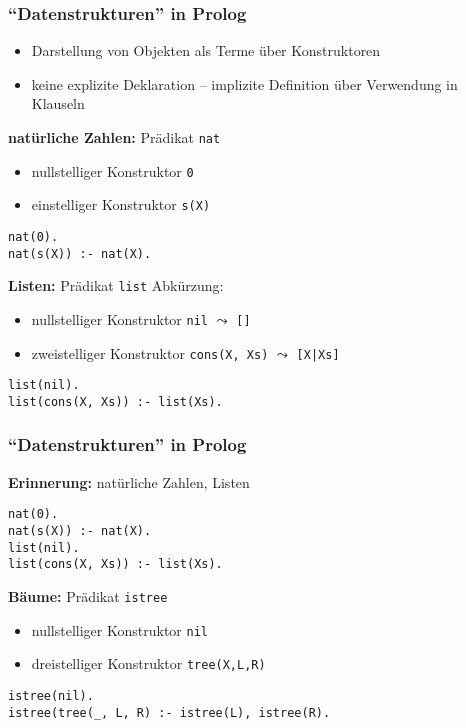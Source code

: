 \documentclass{beamer}
\begin{document}
\begin{frame}[fragile] \frametitle{\enquote{Datenstrukturen} in Prolog}
	\footnotesize
	\begin{itemize}
		\item Darstellung von Objekten als Terme über Konstruktoren
		\item keine explizite Deklaration -- implizite Definition über Verwendung in Klauseln
	\end{itemize}
	
	\textbf{natürliche Zahlen:} Prädikat \texttt{nat}
	\vspace{-.75em}
	\begin{itemize} 
		\item nullstelliger Konstruktor \texttt{0} 
		\item einstelliger Konstruktor \texttt{s(X)}
	\end{itemize}
	
	\begin{lstlisting}
nat(0).
nat(s(X)) :- nat(X).
	\end{lstlisting}
	
	\textbf{Listen:} Prädikat \texttt{list}
	\hfill Abkürzung:
	\vspace{-.75em}
	\begin{itemize} 
		\item nullstelliger Konstruktor \texttt{nil} 
		\hfill $\leadsto$ \texttt{[]} 
		\item zweistelliger Konstruktor \texttt{cons(X, Xs)}
		\hfill $\leadsto$ \texttt{[X|Xs]}
	\end{itemize}
	
	\begin{lstlisting}[firstnumber=3]
list(nil).
list(cons(X, Xs)) :- list(Xs).
	\end{lstlisting}
\end{frame}

\begin{frame}[fragile] \frametitle{\enquote{Datenstrukturen} in Prolog}
	\footnotesize
	
	\textbf{Erinnerung:} natürliche Zahlen, Listen
	
	\begin{lstlisting}
nat(0).
nat(s(X)) :- nat(X).
list(nil).
list(cons(X, Xs)) :- list(Xs).
	\end{lstlisting}
	
	\textbf{Bäume:} Prädikat \texttt{istree}
	\vspace{-0.5em}
	\begin{itemize} \footnotesize
		\item nullstelliger Konstruktor \texttt{nil}
		\item dreistelliger Konstruktor \texttt{tree(X,L,R)} 
	\end{itemize}
	
	\begin{lstlisting}[firstnumber=5]
istree(nil).
istree(tree(_, L, R) :- istree(L), istree(R).
	\end{lstlisting}
\end{frame}
\end{document}
